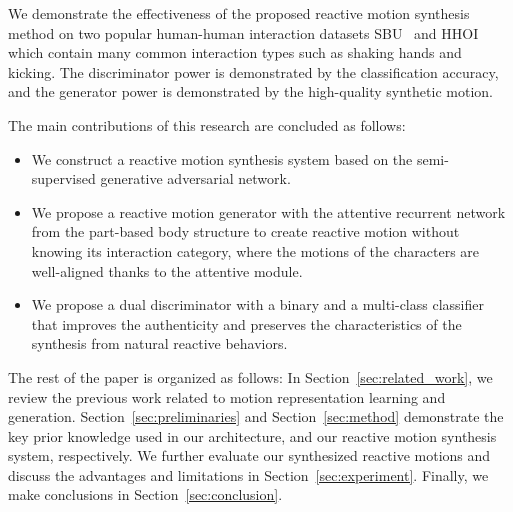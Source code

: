 \documentclass[times,twocolumn,final]{elsarticle}
\begin{document}
We demonstrate the effectiveness of the proposed reactive motion synthesis method on two popular human-human interaction datasets SBU~\cite{yun2012two} and HHOI~\cite{shu2016learning} which contain many common interaction types such as shaking hands and kicking. The discriminator power is demonstrated by the classification accuracy, and the generator power is demonstrated by the high-quality synthetic motion. 

The main contributions of this research are concluded as follows:
\begin{itemize}
\item We construct a reactive motion synthesis system based on the semi-supervised generative adversarial network.
\item We propose a reactive motion generator with the attentive recurrent network from the part-based body structure to create reactive motion without knowing its interaction category, where the motions of the characters are well-aligned thanks to the attentive module.
\item We propose a dual discriminator with a binary and a multi-class classifier that improves the authenticity and preserves the characteristics of the synthesis from natural reactive behaviors.
\end{itemize}


The rest of the paper is organized as follows: In Section~\ref{sec:related_work}, we review the previous work related to motion representation learning and generation. Section~\ref{sec:preliminaries} and Section~\ref{sec:method} demonstrate the key prior knowledge used in our architecture, and our reactive motion synthesis system, respectively. We further evaluate our synthesized reactive motions and discuss the advantages and limitations in Section~\ref{sec:experiment}. Finally, we make conclusions in Section~\ref{sec:conclusion}.
\end{document}
